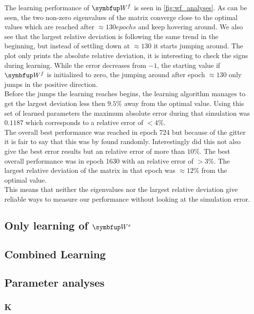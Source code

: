 The learning performance of $\bmu{W}^f$ is seen in \cref{fig:wf_analyses}. As can be seen, the two non-zero eigenvalues of the matrix converge close to the
optimal values which are reached after $\approx 130 epochs$ and keep hovering around.
We also see that the largest relative deviation is following the same trend in the beginning, but instead of settling down at $\approx 130$ it starts jumping around. The plot only prints the absolute relative deviation, it is interesting to check the signs during learning. While the error decreases from $-1$, the starting value if $\bmu{W}^f$ is initialized to zero, the jumping around after epoch $\approx 130$ only jumps in the positive direction.\\
Before the jumps the learning reaches begins, the learning algorithm manages to get the largest deviation less then $9.5\%$ away from the optimal value. Using this set of learned parameters the maximum absolute error during that simulation was $0.1187$ which corresponds to a relative error of $<4\%$.\\
The overall best performance was reached in epoch 724 but because of the gitter it is fair to say that this was by found randomly. Interestingly did this not also give the best error results but an relative error of more than $10\%$. The best overall performance was in epoch 1630 with an relative error of $>3\%$. The largest relative deviation of the matrix  in that epoch was $\approx 12\%$ from the optimal value.\\
This means that neither the eigenvalues nor the largest relative deviation give reliable ways to measure our performance without looking at the simulation error.


\subsection{Only learning of $\bmu{W}^s$}

\subsection{Combined Learning}

\subsection{Parameter analyses}
\subsubsection{K}
